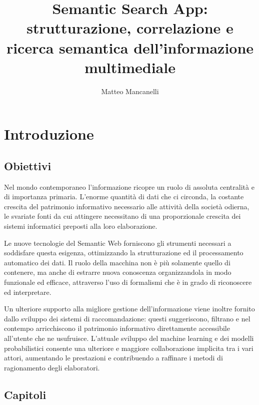\documentclass[Lau,binding=0.6cm,noexaminfo,oneside]{sapthesis}
\title{Semantic Search App: strutturazione, correlazione e ricerca semantica dell'informazione multimediale}
\author{Matteo Mancanelli}
\begin{document}
\frontmatter
\maketitle


\tableofcontents

\mainmatter
\chapter{Introduzione}
\section{Obiettivi}

Nel mondo contemporaneo l'informazione ricopre un ruolo di assoluta centralità e di importanza primaria. L'enorme quantità di dati che ci circonda, la costante crescita del patrimonio informativo necessario alle attività della società odierna, le svariate fonti da cui attingere necessitano di una proporzionale crescita dei sistemi informatici preposti alla loro elaborazione.\medskip

Le nuove tecnologie del Semantic Web forniscono gli strumenti necessari a soddisfare questa esigenza, ottimizzando la strutturazione ed il processamento automatico dei dati. Il ruolo della macchina non è più solamente quello di contenere, ma anche di estrarre nuova conoscenza organizzandola in modo funzionale ed efficace, attraverso l'uso di formalismi che è in grado di riconoscere ed interpretare.\medskip

Un ulteriore supporto alla migliore gestione dell'informazione viene inoltre fornito dallo sviluppo dei sistemi di raccomandazione: questi suggeriscono, filtrano e nel contempo arricchiscono il patrimonio informativo direttamente accessibile all'utente che ne usufruisce. L'attuale sviluppo del machine learning e dei modelli probabilistici consente una ulteriore e maggiore collaborazione implicita tra i vari attori, aumentando le prestazioni e contribuendo a raffinare i metodi di ragionamento degli elaboratori.\medskip

\section{Capitoli}
\end{document}
